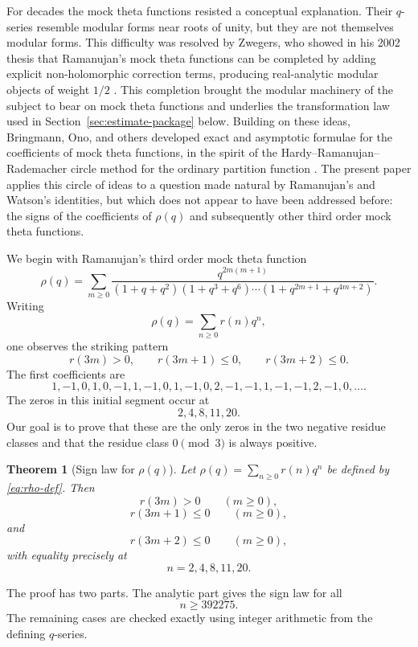 \documentclass[10pt,a4paper]{amsart}
\newtheorem{theorem}{Theorem}[section]
\begin{document}
For decades the mock theta functions resisted a conceptual explanation.  Their $q$-series resemble modular forms near roots of unity, but they are not themselves modular forms.  This difficulty was resolved by Zwegers, who showed in his 2002 thesis that Ramanujan's mock theta functions can be completed by adding explicit non-holomorphic correction terms, producing real-analytic modular objects of weight $1/2$ \cite{ZwegersThesis}.  This completion brought the modular machinery of the subject to bear on mock theta functions and underlies the transformation law used in Section~\ref{sec:estimate-package} below.  Building on these ideas, Bringmann, Ono, and others developed exact and asymptotic formulae for the coefficients of mock theta functions, in the spirit of the Hardy--Ramanujan--Rademacher circle method for the ordinary partition function \cite{BringmannOno,BringmannOnoCoeff,Folsom}.  The present paper applies this circle of ideas to a question made natural by Ramanujan's and Watson's identities, but which does not appear to have been addressed before: the signs of the coefficients of $\rho(q)$ and subsequently other third order mock theta functions.

We begin with Ramanujan's third order mock theta function
\begin{equation}\label{eq:rho-def}
\rho(q)=\sum_{m\geq 0}\frac{q^{2m(m+1)}}{(1+q+q^2)(1+q^3+q^6)\cdots(1+q^{2m+1}+q^{4m+2})}.
\end{equation}
Writing
\[
\rho(q)=\sum_{n\geq 0}r(n)q^n,
\]
one observes the striking pattern
\[
r(3m)>0,
\qquad
r(3m+1)\leq 0,
\qquad
r(3m+2)\leq 0.
\]
The first coefficients are
\[
1,-1,0,1,0,-1,1,-1,0,1,-1,0,2,-1,-1,1,-1,-1,2,-1,0,\ldots .
\]
The zeros in this initial segment occur at
\[
2,4,8,11,20.
\]
Our goal is to prove that these are the only zeros in the two negative residue classes and that the residue class $0\pmod 3$ is always positive.


\begin{theorem}[Sign law for $\rho(q)$]\label{thm:main}
Let $\rho(q)=\sum_{n\geq0}r(n)q^n$ be defined by \eqref{eq:rho-def}. Then
\[
r(3m)>0\qquad(m\geq0),
\]
\[
r(3m+1)\leq 0\qquad(m\geq0),
\]
and
\[
r(3m+2)\leq 0\qquad(m\geq0),
\]
with equality precisely at
\[
n=2,4,8,11,20.
\]
\end{theorem}


The proof has two parts. The analytic part gives the sign law for all
\[
n\geq 392275.
\]
The remaining cases are checked exactly using integer arithmetic from the defining $q$-series.
\end{document}
